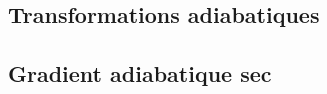 	\sk \subsection{Transformations adiabatiques}
	

	\sk \subsection{Gradient adiabatique sec} \label{adiabsec}
	






